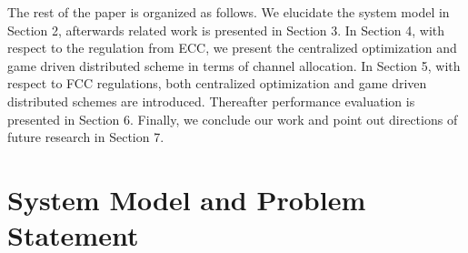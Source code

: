 \documentclass[times]{ettauth}
\newcommand{\ie}{i.e., }
\theoremstyle{mytheoremstyle}
\theoremstyle{mytheoremstyle}
\theoremstyle{mytheoremstyle}
\begin{document}



The rest of the paper is organized as follows. 
We elucidate the system model in Section 2, afterwards related work is presented in Section 3. 
In Section 4, with respect to the regulation from ECC, we present the centralized optimization and game driven distributed scheme in terms of channel allocation.
In Section 5, with respect to FCC regulations, both centralized optimization and game driven distributed schemes are introduced.
Thereafter performance evaluation is presented in Section 6.
Finally, we conclude our work and point out directions of future research in Section 7.


\section{System Model and Problem Statement}
\label{SystemModel}
\end{document}
